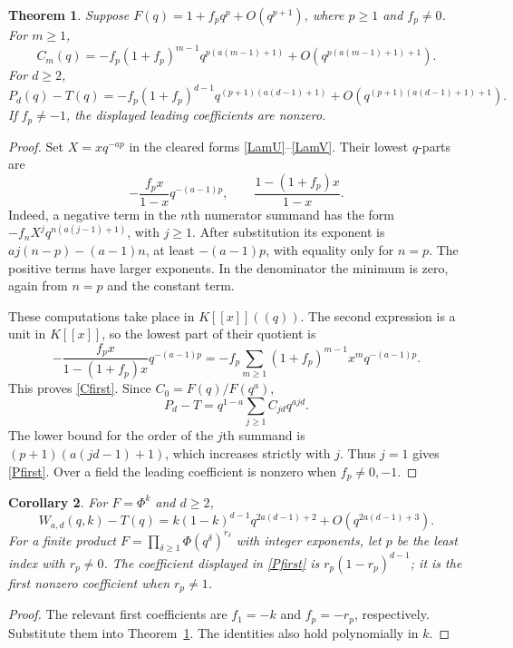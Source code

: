 \documentclass[11pt]{amsart}
\newtheorem{theorem}{Theorem}[section]
\newtheorem{corollary}[theorem]{Corollary}
\theoremstyle{definition}
\theoremstyle{remark}
\numberwithin{equation}{section}
\begin{document}
\begin{theorem}\label{contact}
Suppose $F(q)=1+f_pq^p+O(q^{p+1})$, where $p\ge1$ and $f_p\ne0$. For $m\ge1$,
\begin{equation}\label{Cfirst}
 C_m(q)=-f_p(1+f_p)^{m-1}q^{p(a(m-1)+1)}
       +O\!\left(q^{p(a(m-1)+1)+1}\right).
\end{equation}
For $d\ge2$,
\begin{equation}\label{Pfirst}
 P_d(q)-T(q)=-f_p(1+f_p)^{d-1}q^{(p+1)(a(d-1)+1)}
       +O\!\left(q^{(p+1)(a(d-1)+1)+1}\right).
\end{equation}
If $f_p\ne-1$, the displayed leading coefficients are nonzero.
\end{theorem}
\begin{proof}
Set $X=xq^{-ap}$ in the cleared forms \eqref{LamU}--\eqref{LamV}. Their lowest $q$-parts are
\[
 -\frac{f_px}{1-x}q^{-(a-1)p},\qquad
 \frac{1-(1+f_p)x}{1-x}.
\]
Indeed, a negative term in the $n$th numerator summand has the form $-f_nX^jq^{n(a(j-1)+1)}$, with $j\ge1$. After substitution its exponent is $aj(n-p)-(a-1)n$, at least $-(a-1)p$, with equality only for $n=p$. The positive terms have larger exponents. In the denominator the minimum is zero, again from $n=p$ and the constant term.

These computations take place in $K[[x]]((q))$. The second expression is a unit in $K[[x]]$, so the lowest part of their quotient is
\[
 -\frac{f_px}{1-(1+f_p)x}q^{-(a-1)p}
 =-f_p\sum_{m\ge1}(1+f_p)^{m-1}x^mq^{-(a-1)p}.
\]
This proves \eqref{Cfirst}. Since $C_0=F(q)/F(q^a)$,
\[
 P_d-T=q^{1-a}\sum_{j\ge1}C_{jd}q^{ajd}.
\]
The lower bound for the order of the $j$th summand is $(p+1)(a(jd-1)+1)$, which increases strictly with $j$. Thus $j=1$ gives \eqref{Pfirst}. Over a field the leading coefficient is nonzero when $f_p\ne0,-1$.
\end{proof}

\begin{corollary}\label{etacontact}
For $F=\Phi^k$ and $d\ge2$,
\begin{equation}\label{Wfirst}
 W_{a,d}(q,k)-T(q)
 =k(1-k)^{d-1}q^{2a(d-1)+2}
  +O\!\left(q^{2a(d-1)+3}\right).
\end{equation}
For a finite product $F=\prod_{\delta\ge1}\Phi(q^\delta)^{r_\delta}$ with integer exponents, let $p$ be the least index with $r_p\ne0$. The coefficient displayed in \eqref{Pfirst} is $r_p(1-r_p)^{d-1}$; it is the first nonzero coefficient when $r_p\ne1$.
\end{corollary}
\begin{proof}
The relevant first coefficients are $f_1=-k$ and $f_p=-r_p$, respectively. Substitute them into Theorem~\ref{contact}. The identities also hold polynomially in $k$.
\end{proof}
\end{document}
